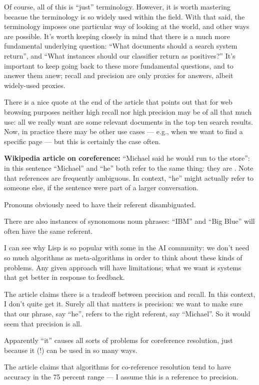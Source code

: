 Of course, all of this is ``just'' terminology.  However, it is worth
mastering becasue the terminology is so widely used within the field.
With that said, the terminology imposes one particular way of looking
at the world, and other ways are possible.  It's worth keeping closely
in mind that there is a much more fundamental underlying question:
``What documents should a search system return'', and ``What instances
should our classifier return as positives?''  It's important to keep
going back to these more fundamental questions, and to answer them
anew; recall and precision are only proxies for answers, albeit
widely-used proxies.

There is a nice quote at the end of the article that points out that
for web browsing purposes neither high recall nor high precision may
be of all that much use: all we really want are some relevant
documents in the top ten search results.  Now, in practice there may
be other use cases --- e.g., when we want to find a specific page ---
but this is certainly the case often.

\textbf{Wikipedia article on coreference:} ``Michael said he would run
to the store'': in this sentence ``Michael'' and ``he'' both refer to
the same thing: they are .  Note that references are
frequently ambiguous.  In context, ``he'' might actually refer to
someone else, if the sentence were part of a larger conversation.

Pronouns obviously need to have their referent disambiguated.  

There are also instances of synonomous noun phrases: ``IBM'' and ``Big
Blue'' will often have the same referent.

I can see why Lisp is so popular with some in the AI community: we
don't need so much algorithms as meta-algorithms in order to think
about these kinds of problems.  Any given approach will have
limitations; what we want is systems that get better in response to
feedback.

The article claims there is a tradeoff between precision and
recall. In this context, I don't quite get it.  Surely all that
matters is precision: we want to make sure that our phrase, say
``he'', refers to the right referent, say ``Michael''.  So it would
seem that precision is all. 

Apparently ``it'' causes all sorts of problems for coreference
resolution, just because it (!) can be used in so many ways.

The article claims that algorithms for co-reference resolution tend to
have accuracy in the 75 percent range --- I assume this is a reference
to precision.

